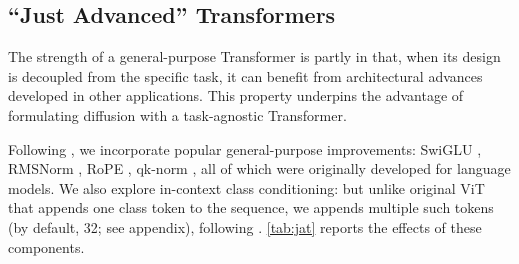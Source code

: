 \subsection{``Just Advanced'' Transformers}

The strength of a general-purpose Transformer \cite{vaswani2017attention} is partly in that, when its design is decoupled from the specific task, it can benefit from architectural advances developed in other applications. This property underpins the advantage of formulating diffusion with a task-agnostic Transformer.


Following \cite{yao2025reconstruction},
we incorporate popular general-purpose improvements\footnotemark: SwiGLU \cite{shazeer2020glu}, RMSNorm \cite{zhang2019root}, RoPE \cite{su2024roformer}, qk-norm \cite{henry2020query}, all of which were originally developed for language models. 
We also explore in-context class conditioning: but unlike original ViT \cite{Dosovitskiy2021} that appends one class token to the sequence, we appends multiple such tokens (by default, 32; see appendix), following \cite{li2024autoregressive}.
\cref{tab:jat} reports the effects of these components. 


